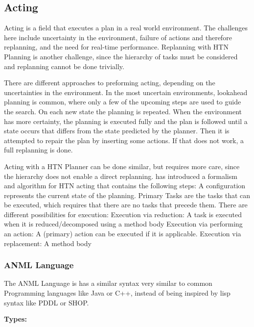 \subsection{Acting}\label{sec:acting}

Acting is a field that executes a plan in a real world environment.
The challenges here include uncertainty in the environment, failure of actions and therefore replanning, and the need for real-time performance.
Replanning with HTN Planning is another challenge, since the hierarchy of tasks must be considered and replanning cannot be done trivially.

There are different approaches to preforming acting, depending on the uncertainties in the environment.
In the most uncertain environments, lookahead planning is common, where only a few of the upcoming steps are used to guide the search. 
On each new state the planning is repeated.
When the environment has more certainty, the planning is executed fully and the plan is followed until a state occurs that differs from the state predicted by the planner.
Then it is attempted to repair the plan by inserting some actions. 
If that does not work, a full replanning is done.

Acting with a HTN Planner can be done similar, but requires more care, since the hierarchy does not enable a direct replanning.
 has introduced a formalism and algorithm for HTN acting that contains the following steps:
A configuration represents the current state of the planning.
Primary Tasks are the tasks that can be executed, which requires that there are no tasks that precede them.
There are different possibilities for execution:
Execution via reduction: A task is executed when it is reduced/decomposed using a method body
Execution via performing an action: A (primary) action can be executed if it is applicable.
Execution via replacement: A method body



\subsubsection{ANML Language}

\lstset{
  language=ANML,
  style=anmlStyle,
}

The ANML Language is has a similar syntax very similar to common Programming languages like Java or C++, instead of being inspired by lisp syntax like PDDL or SHOP.

{\bf Types:}


